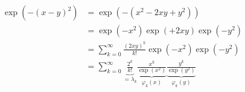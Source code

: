 \begin{align*}
    \exp(-(x-y)^2)&=\exp(-(x^2-2xy+y^2))\\
    &=\exp(-x^2)\exp(+2xy)\exp(-y^2)\\
    &=\sum_{k=0}^\infty \frac{(2xy)^k}{k!}\exp(-x^2)\exp(-y^2)\\
    &=\sum_{k=0}^\infty\underbrace{\frac{2^k}{k!}}_{=\lambda_k}\underbrace{\frac{x^k}{\exp(x^2)}}_{\varphi_k(x)}\underbrace{\frac{y^k}{\exp(y^2)}}_{\varphi_k(y)}
\end{align*}

